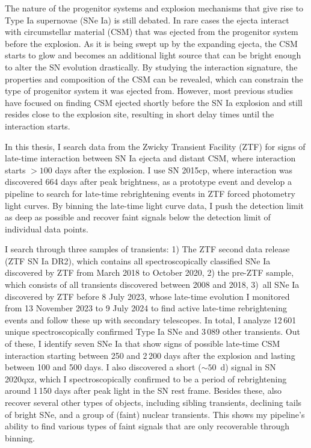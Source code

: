 

\begin{abstracts} 
The nature of the progenitor systems and explosion mechanisms that give rise to Type Ia supernovae (SNe Ia) is still debated. In rare cases the ejecta interact with circumstellar material (CSM) that was ejected from the progenitor system before the explosion. As it is being swept up by the expanding ejecta, the CSM starts to glow and becomes an additional light source that can be bright enough to alter the SN evolution drastically. By studying the interaction signature, the properties and composition of the CSM can be revealed, which can constrain the type of progenitor system it was ejected from. However, most previous studies have focused on finding CSM ejected shortly before the SN Ia explosion and still resides close to the explosion site, resulting in short delay times until the interaction starts.

In this thesis, I search data from the Zwicky Transient Facility (ZTF) for signs of late-time interaction between SN Ia ejecta and distant CSM, where interaction starts $>100$ days after the explosion. I use SN 2015cp, where interaction was discovered 664 days after peak brightness, as a prototype event and develop a pipeline to search for late-time rebrightening events in ZTF forced photometry light curves. By binning the late-time light curve data, I push the detection limit as deep as possible and recover faint signals below the detection limit of individual data points.

I search through three samples of transients: 1) The ZTF second data release (ZTF SN Ia DR2), which contains all spectroscopically classified SNe Ia discovered by ZTF from March 2018 to October 2020, 2) the pre-ZTF sample, which consists of all transients discovered between 2008 and 2018, 3)~all SNe Ia discovered by ZTF before 8 July 2023, whose late-time evolution I monitored from 13 November 2023 to 9 July 2024 to find active late-time rebrightening events and follow these up with secondary telescopes. In total, I analyze 12\,601 unique spectroscopically confirmed Type Ia SNe and 3\,089 other transients. Out of these, I identify seven SNe Ia that show signs of possible late-time CSM interaction starting between 250 and 2\,200 days after the explosion and lasting between 100 and 500 days. I also discovered a short ($\sim50$~d) signal in SN 2020qxz, which I spectroscopically confirmed to be a period of rebrightening around 1\,150 days after peak light in the SN rest frame. Besides these, also recover several other types of objects, including sibling transients, declining tails of bright SNe, and a group of (faint) nuclear transients. This shows my pipeline's ability to find various types of faint signals that are only recoverable through binning.


\end{abstracts}
